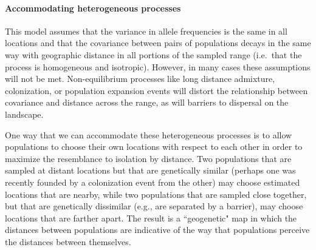 \documentclass[12pt]{article}
\newcommand{\plrm}[1]{\todo[color=green!20]{#1}}
\newcommand{\plrm}[1]{\plr{#1}}
\newcommand{\plr}[1]{{\it\color{green}{(#1)}}}
\begin{document}
\paragraph{Accommodating heterogeneous processes}
This model assumes that the variance in allele frequencies is the same in all locations 
\plrm{but, nugget?}
and that the covariance between pairs of populations decays in the same way with geographic distance in all portions of the sampled range (i.e.\ that the process is homogeneous and isotropic). However, in many cases these assumptions will not be met. Non-equilibrium processes like long distance admixture, colonization, or population expansion events will  distort the relationship between covariance and distance across the range, as will barriers to dispersal on the landscape.

One way that we can accommodate these heterogeneous processes is to allow populations to choose their own locations with respect to each other in order to maximize the resemblance to isolation by distance. 
\plr{or, ``\ldots to infer the locations of populations on a map that reflects genetic, rather than geographic, proximity \ldots''} 
Two populations that are sampled at distant locations but that are genetically similar (perhaps one was recently founded by a colonization event from the other) may choose estimated locations that are nearby, while two populations that are sampled close together, but that are genetically dissimilar (e.g., are separated by a barrier), may choose locations that are farther apart. The result is a ``geogenetic" map in which the distances between populations are indicative of the way that populations perceive the distances between themselves.
\end{document}
